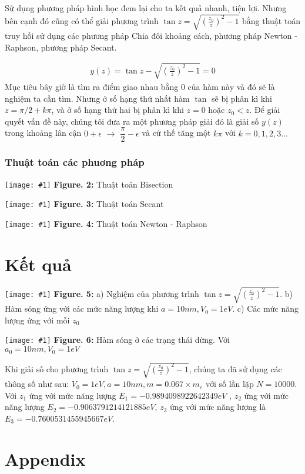 \documentclass{article}
\newcommand{\image}[3]{
	\begin{center}
		\texttt{[image: \#1]}
		\textbf{Figure. #2:} #3
		\label{fig:#1}
	\end{center}
}
\begin{document}
	Sử dụng phương pháp hình học đem lại cho ta kết quả nhanh, tiện lợi. Nhưng bên cạnh đó cũng có thể giải phương trình $\tan z = \sqrt{\left( \frac{z_0}{z} \right)^2 - 1}$ bằng thuật toán truy hồi sử dụng các phương pháp Chia đôi khoảng cách, phương pháp Newton - Raphson, phương pháp Secant.
	
	\begin{align}
		y(z) = \tan z - \sqrt{\left( \frac{z_0}{z} \right)^2 - 1} = 0
	\end{align}
	Mục tiêu bây giờ là tìm ra điểm giao nhau bằng 0 của hàm này và đó sẽ là nghiệm ta cần tìm. Nhưng ở số hạng thứ nhất hàm $\tan$ sẽ bị phân kì khi $z = \pi/2 + k \pi$, và ở số hạng thứ hai bị phân kì khi $z = 0$ hoặc $z_0 < z$. Để giải quyết vấn đề này, chúng tôi đưa ra một phương pháp giải đó là giải số $y(z)$ trong khoảng lân cận $0+ \epsilon$ $\rightarrow $ $\dfrac{\pi}{2} - \epsilon$ và cứ thế tăng một $k\pi$ với $k = 0,1,2,3...$
	
	\subsubsection{Thuật toán các phuơng pháp}
	\image{Bisection.png}{2}{Thuật toán Bisection}
	\image{Secant.png}{3}{Thuật toán Secant}
	\image{Newton.png}{4}{Thuật toán Newton - Raphson}
	
	\newpage
	
	\section{Kết quả}
	\image{Final.pdf}{5}{a) Nghiệm của phương trình $\tan z = \sqrt{\left( \frac{z_0}{z} \right)^2 - 1}$. b) Hàm sóng ứng với các mức năng lượng khi $a = 10nm, V_0 = 1eV$. c) Các mức năng lượng ứng với mỗi $z_0$}
	
	\image{wavefunctions.pdf}{6}{Hàm sóng ở các trạng thái dừng. Với $a_0 = 10nm, V_0 = 1eV $}

	Khi giải số cho phương trình $\tan z = \sqrt{\left( \frac{z_0}{z} \right)^2 - 1}$, chúng ta đã sử dụng các thông số như sau: $V_0 = 1eV, a = 10 nm,m = 0.067 \times m_e$ với số lần lặp $N= 10000$. \\
	Với $z_1$ ứng với mức năng lượng $E_1 = - 0.9894098922642349 eV$ , $z_2$ ứng với mức năng lượng $E_2 = - 0.9063791214121885 eV$, $z_3$ ứng với mức năng lượng là $E_3 = - 0.7600531455945667 eV$.

	\clearpage
	\section{Appendix}
\end{document}

